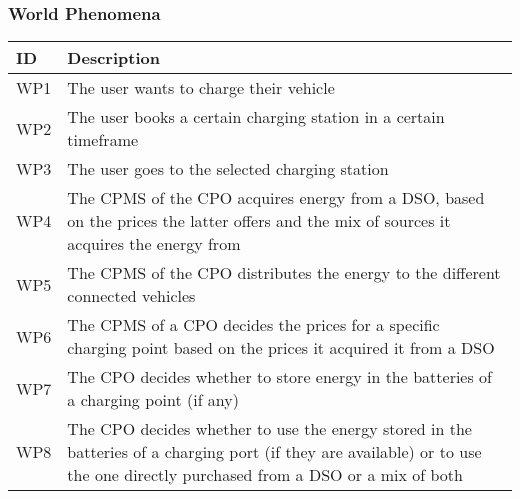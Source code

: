 \subsubsection{World Phenomena}
\begin{table}[h!]
    \centering
    \begin{tabular}{|m{0.9cm}|m{10.5cm}|}
      \hline
      \bfseries ID & \bfseries Description\\
      \hline
      \centering WP1 & The user wants to charge their vehicle\\
      \hline
      \centering WP2 & The user books a certain charging station in a certain timeframe\\
      \hline
      \centering WP3 & The user goes to the selected charging station\\
      \hline
      \centering WP4 & The CPMS of the CPO acquires energy from a DSO, based on the prices the latter offers and the mix of sources it acquires the energy from\\
      \hline
      \centering WP5 & The CPMS of the CPO distributes the energy to the different connected vehicles\\
      \hline
      \centering WP6 & The CPMS of a CPO decides the prices for a specific charging point based on the prices it acquired it from a DSO\\
      \hline
      \centering WP7 & The CPO decides whether to store energy in the batteries of a charging point (if any)\\
      \hline
      \centering WP8 & The CPO decides whether to use the energy stored in the batteries of a charging port (if they are available) or to use the one directly purchased from a DSO or a mix of both\\
      \hline
    \end{tabular}
\end{table}
